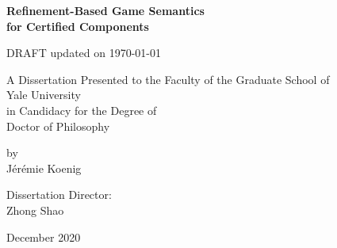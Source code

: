 \documentclass[draft,11pt]{report}
\theoremstyle{definition}
\begin{document}
\begin{titlepage} %
  \large
  \centering

  \vspace*{0in}
  {\Huge \bf Refinement-Based Game Semantics \\ for Certified Components}

  DRAFT updated on \today

  \vfill
  A Dissertation
  Presented to the Faculty of the Graduate School
  of \\
  {\Large Yale University} \\
  in Candidacy for the Degree of \\
  {\Large Doctor of Philosophy}

  \vfill
  by \\
  {\Large J\'er\'emie Koenig}

  \vfill
  Dissertation Director: \\
  {\Large Zhong Shao}

  \vfill
  December 2020
\end{titlepage}
\end{document}
